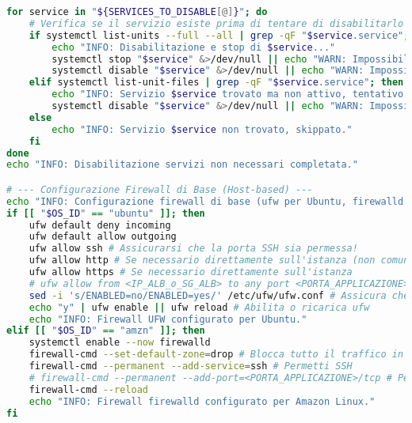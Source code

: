 \begin{lstlisting}[language=Bash, style=bash, caption={Script di Hardening del Sistema Operativo (hardening\_script.sh)}, label={lst:hardening_script_cap2}]
for service in "${SERVICES_TO_DISABLE[@]}"; do
    # Verifica se il servizio esiste prima di tentare di disabilitarlo
    if systemctl list-units --full --all | grep -qF "$service.service"; then
        echo "INFO: Disabilitazione e stop di $service..."
        systemctl stop "$service" &>/dev/null || echo "WARN: Impossibile stoppare $service (potrebbe essere gia\` stoppato)"
        systemctl disable "$service" &>/dev/null || echo "WARN: Impossibile disabilitare $service (potrebbe non esistere o essere statico)"
    elif systemctl list-unit-files | grep -qF "$service.service"; then # Prova a disabilitare anche se non attivo
        echo "INFO: Servizio $service trovato ma non attivo, tentativo di disabilitazione..."
        systemctl disable "$service" &>/dev/null || echo "WARN: Impossibile disabilitare $service"
    else
        echo "INFO: Servizio $service non trovato, skippato."
    fi
done
echo "INFO: Disabilitazione servizi non necessari completata."

# --- Configurazione Firewall di Base (Host-based) ---
echo "INFO: Configurazione firewall di base (ufw per Ubuntu, firewalld per Amazon Linux)..."
if [[ "$OS_ID" == "ubuntu" ]]; then
    ufw default deny incoming
    ufw default allow outgoing
    ufw allow ssh # Assicurarsi che la porta SSH sia permessa!
    ufw allow http # Se necessario direttamente sull'istanza (non comune se dietro ALB)
    ufw allow https # Se necessario direttamente sull'istanza
    # ufw allow from <IP_ALB_o_SG_ALB> to any port <PORTA_APPLICAZIONE>
    sed -i 's/ENABLED=no/ENABLED=yes/' /etc/ufw/ufw.conf # Assicura che ufw sia abilitato al boot
    echo "y" | ufw enable || ufw reload # Abilita o ricarica ufw
    echo "INFO: Firewall UFW configurato per Ubuntu."
elif [[ "$OS_ID" == "amzn" ]]; then
    systemctl enable --now firewalld
    firewall-cmd --set-default-zone=drop # Blocca tutto il traffico in entrata di default
    firewall-cmd --permanent --add-service=ssh # Permetti SSH
    # firewall-cmd --permanent --add-port=<PORTA_APPLICAZIONE>/tcp # Permetti la porta dell'applicazione
    firewall-cmd --reload
    echo "INFO: Firewall firewalld configurato per Amazon Linux."
fi


\end{lstlisting}
